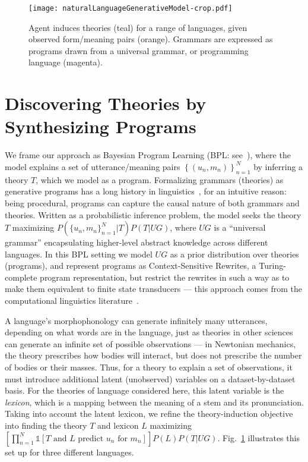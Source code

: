 \documentclass[12pt]{article}
\newcommand{\indicator}{\mathds{1}} %
\begin{document}
\begin{figure}
  \texttt{[image: naturalLanguageGenerativeModel-crop.pdf]}
  \caption{Agent induces theories (teal) for a range of languages, given observed form/meaning pairs (orange). Grammars are expressed as programs drawn from a universal grammar, or programming language (magenta). }\label{generativeModel}
  \end{figure}







\section*{Discovering Theories by Synthesizing Programs} 

We frame our approach as Bayesian Program Learning (BPL:
see~\cite{lake2015human}), where the model explains a set of
utterance/meaning pairs $\left\{(u_n,m_n) \right\}_{n = 1}^N$ by
inferring a theory $T$, which we model as a program.  Formalizing
grammars (theories) as generative programs has a long history in
linguistics~\cite{chomsky1968sound},
for an intuitive reason: being procedural,
programs can capture the causal nature of
both grammars and theories.
Written as a probabilistic
inference problem, the model seeks the theory $T$ maximizing
$P(\{u_n,m_n\}_{n = 1}^N | T)P(T|UG)$, where $UG$ is a ``universal
grammar'' encapsulating  higher-level abstract knowledge across
different languages.  In this BPL setting we model $UG$ as a prior
distribution over theories (programs), and represent programs as
Context-Sensitive Rewrites, a Turing-complete program representation,
but restrict the rewrites in such a way as to make them equivalent to
finite state transducers --- this approach comes from the computational
linguistics literature~\cite{beesley2003finite}.

A language's morphophonology can generate infinitely many
utterances,
depending on what words are in the language,
just as theories in other sciences
can generate an infinite set of
possible observations --- in Newtonian mechanics,
the theory prescribes
how bodies will interact,
but does not prescribe
the number of bodies or their masses.
Thus, for a theory to explain a set of observations,
it must introduce additional latent (unobserved)
variables on a dataset-by-dataset basis.
For the theories of language considered here,
this latent variable is the \emph{lexicon},
which is a mapping between
the meaning of a stem and its pronunciation.
Taking into account the latent lexicon,
we refine the theory-induction objective into
finding the theory $T$ and lexicon $L$ maximizing
$\left[\prod_{n = 1}^N \indicator[T\text{ and }L\text{ predict }u_n\text{ for }m_n] \right]P(L)P(T|UG)$.
Fig.~\ref{generativeModel} illustrates this set up for three different languages.
\end{document}
